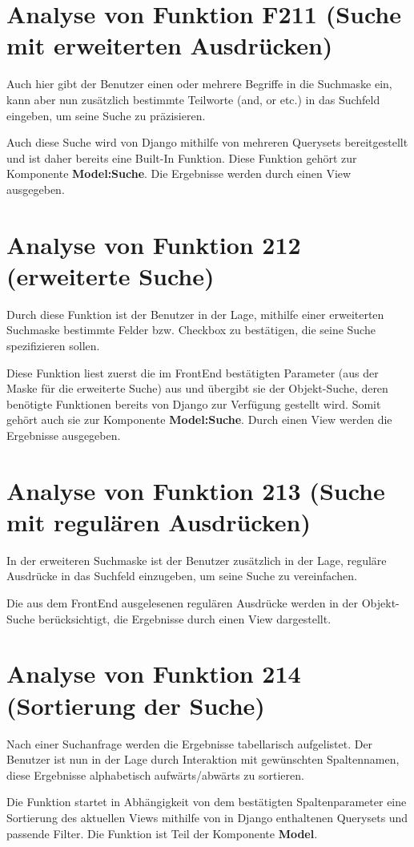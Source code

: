 \section{Analyse von Funktion F211 (Suche mit erweiterten Ausdrücken)}
Auch hier gibt der Benutzer einen oder mehrere Begriffe in die Suchmaske ein, kann aber nun zusätzlich bestimmte Teilworte (and, or etc.) in das Suchfeld eingeben, um seine Suche zu präzisieren.  

Auch diese Suche wird von Django mithilfe von mehreren Querysets bereitgestellt und ist daher bereits eine Built-In Funktion. Diese Funktion gehört zur Komponente \textbf{Model:Suche}. 
Die Ergebnisse werden durch einen View ausgegeben. 

\section{Analyse von Funktion 212 (erweiterte Suche)}
Durch diese Funktion ist der Benutzer in der Lage, mithilfe einer erweiterten Suchmaske bestimmte Felder bzw. Checkbox zu bestätigen, die seine Suche spezifizieren sollen.
    
Diese Funktion liest zuerst die im FrontEnd bestätigten Parameter (aus der Maske für die erweiterte Suche) aus und übergibt sie der Objekt-Suche, deren benötigte Funktionen bereits von Django zur Verfügung gestellt wird. Somit gehört auch sie zur Komponente \textbf{Model:Suche}. Durch einen View werden die Ergebnisse ausgegeben.  

\section{Analyse von Funktion 213 (Suche mit regulären Ausdrücken)}
In der erweiteren Suchmaske ist der Benutzer zusätzlich in der Lage, reguläre Ausdrücke in das Suchfeld einzugeben, um seine Suche zu vereinfachen. 

Die aus dem FrontEnd ausgelesenen regulären Ausdrücke werden in der Objekt-Suche berücksichtigt, die Ergebnisse durch einen View dargestellt. 
 
\section{Analyse von Funktion 214 (Sortierung der Suche)}
Nach einer Suchanfrage werden die Ergebnisse tabellarisch aufgelistet. Der Benutzer ist nun in der Lage durch Interaktion mit gewünschten Spaltennamen, diese Ergebnisse alphabetisch aufwärts/abwärts zu sortieren. 

Die Funktion startet in Abhängigkeit von dem bestätigten Spaltenparameter eine Sortierung des aktuellen Views mithilfe von in Django enthaltenen Querysets und passende Filter. Die Funktion ist Teil der Komponente \textbf{Model}. 




 